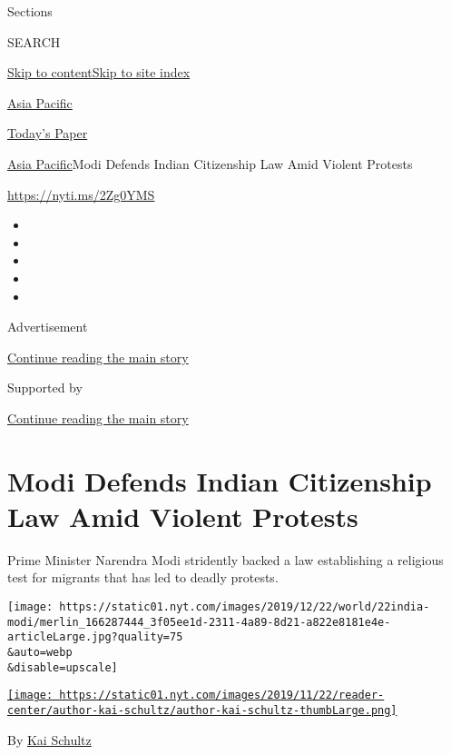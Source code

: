 Sections

SEARCH

\protect\hyperlink{site-content}{Skip to
content}\protect\hyperlink{site-index}{Skip to site index}

\href{https://www.nytimes.com/section/world/asia}{Asia Pacific}

\href{https://myaccount.nytimes.com/auth/login?response_type=cookie\&client_id=vi}{}

\href{https://www.nytimes.com/section/todayspaper}{Today's Paper}

\href{/section/world/asia}{Asia Pacific}\textbar{}Modi Defends Indian
Citizenship Law Amid Violent Protests

\url{https://nyti.ms/2Zg0YMS}

\begin{itemize}
\item
\item
\item
\item
\item
\end{itemize}

Advertisement

\protect\hyperlink{after-top}{Continue reading the main story}

Supported by

\protect\hyperlink{after-sponsor}{Continue reading the main story}

\hypertarget{modi-defends-indian-citizenship-law-amid-violent-protests}{%
\section{Modi Defends Indian Citizenship Law Amid Violent
Protests}\label{modi-defends-indian-citizenship-law-amid-violent-protests}}

Prime Minister Narendra Modi stridently backed a law establishing a
religious test for migrants that has led to deadly protests.

\texttt{[image: https://static01.nyt.com/images/2019/12/22/world/22india-modi/merlin\_166287444\_3f05ee1d-2311-4a89-8d21-a822e8181e4e-articleLarge.jpg?quality=75\\\&auto=webp\\\&disable=upscale]}

\href{https://www.nytimes.com/by/kai-schultz}{\texttt{[image: https://static01.nyt.com/images/2019/11/22/reader-center/author-kai-schultz/author-kai-schultz-thumbLarge.png]}}

By \href{https://www.nytimes.com/by/kai-schultz}{Kai Schultz}


